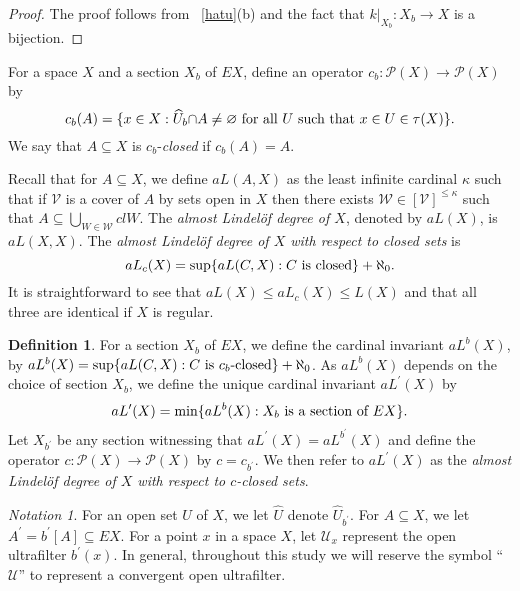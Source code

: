 \documentclass[11pt]{amsart}
\newif\ifdraft\draftfalse
\theoremstyle{definition}
\newtheorem{definition}[theorem]{Definition}
\theoremstyle{remark}
\newtheorem*{notation}{Notation}
\numberwithin{equation}{section}
\begin{document}
\begin{proof}

The proof follows from ~\ref{hatu}(b) and the fact that $k|_{X_b}:X_b \rightarrow X$ is a bijection.
\end{proof}

For a space $X$ and a section $X_b$ of $EX$, define an operator $c_b:{\ensuremath{\mathcal{{P}}}}(X)\to{\ensuremath{\mathcal{{P}}}}(X)$ by
$$c_b(A)=\{x\in X: \widehat{U}_b{\cap} A\neq{\varnothing}\textup{ for all }U\textup{ such that }x\in U\in\tau(X)\}.$$
We say that $A{\subseteq} X$ is $c_b$-\emph{closed} if $c_b(A)=A$.

Recall that for $A{\subseteq} X$, we define $aL(A,X)$ as the least infinite cardinal $\kappa$ such that if ${\ensuremath{\mathcal{{V}}}}$ is a cover of $A$ by sets open in $X$ then there exists ${\ensuremath{\mathcal{{W}}}}\in[{\ensuremath{\mathcal{{V}}}}]^{\leq\kappa}$ such that $A{\subseteq}{\bigcup}_{W\in{\ensuremath{\mathcal{{W}}}}}clW$. The \emph{almost Lindel\"of degree of $X$}, denoted by $aL(X)$, is $aL(X,X)$. The \emph{almost Lindel\"of degree of $X$ with respect to closed sets} is
$$aL_c(X)=\sup\{aL(C,X): C\textup{ is closed}\}+\aleph_0.$$
It is straightforward to see that $aL(X)\leq aL_c(X)\leq L(X)$ and that all three are identical if $X$ is regular.

\begin{definition}{{\immediate{}}{\ifdraft\hspace{-\lastskip}\vadjust{\vspace{-1mm}\smash{\llap{{\tt {{alprime}}}\hspace{8mm}}}\vspace{1mm}}\fi}}
For a section $X_b$ of $EX$, we define the cardinal invariant $aL^b(X)$, by $aL^b(X)=\sup\{aL(C,X): C\textup{ is }c_b\textup{-closed}\}+\aleph_0$. As $aL^b(X)$ depends on the choice of section $X_b$, we define the unique cardinal invariant $aL^\prime(X)$ by
$$aL^\prime(X)=\min\{aL^b(X):X_b\textup{ is a section of }EX\}.$$
Let $X_{b^\prime}$ be any section witnessing that $aL^\prime(X)=aL^{b^\prime}(X)$ and define the operator $c:{\ensuremath{\mathcal{{P}}}}(X)\to{\ensuremath{\mathcal{{P}}}}(X)$ by $c=c_{b^\prime}$. We then refer to $aL^\prime(X)$ as the \emph{almost Lindel\"of degree of $X$ with respect to $c$-closed sets}. 
\end{definition}

\begin{notation}
For an open set $U$ of $X$, we let $\widehat{U}$ denote $\widehat{U}_{b^\prime}$. For $A{\subseteq} X$, we let $A^\prime = b^\prime[A]{\subseteq} EX$. For a point $x$ in a space $X$, let ${\ensuremath{\mathcal{{U}}}}_x$ represent the open ultrafilter $b^\prime(x)$. In general, throughout this study we will reserve the symbol ``${\ensuremath{\mathcal{{U}}}}$'' to represent a convergent open ultrafilter. 
\end{notation}
\end{document}
